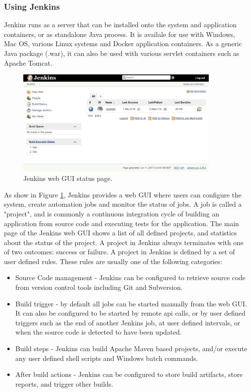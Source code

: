 \subsubsection{Using Jenkins}
Jenkins runs as a server that can be installed onto the system and application containers, or as standalone Java process. It is availale for use with Windows, Mac OS, various Linux systems and Docker application containers. As a generic Java package (.war), it can also be used with various servlet containers such as Apache Tomcat. \\
\begin{figure}[h]
\centering
\caption{Jenkins web GUI status page.}
\label{fig:jenkins}
\includegraphics[width=0.9\textwidth]{images/jenkinshome.png}
\end{figure}
As show in Figure \ref{fig:jenkins}, Jenkins provides a web GUI where users can configure the system, create automation jobs and monitor the status of jobs. A job is called a "project", and is commonly a continuous integration cycle of building an application from source code and executing tests for the application. The main page of the Jenkins web GUI shows a list of all defined projects, and statistics about the status of the project. A project in Jenkins always terminates with one of two outcomes: success or failure. A project in Jenkins is defined by a set of user defined rules. These rules are usually one of the following categories:
\begin{itemize}
\item Source Code management - Jenkins can be configured to retrieve source code from version control tools including Git and Subversion.
\item Build trigger - by default all jobs can be started manually from the web GUI. It can also be configured to be started by remote api calls, or by user defined triggers such as the end of another Jenkins job, at user defined intervals, or when the source code is detected to have been updated.
\item Build steps - Jenkins can build Apache Maven based projects, and/or execute any user defined shell scripts and Windows batch commands.
\item After build actions - Jenkins can be configured to store build artifacts, store reports, and trigger other builds.
\end{itemize}
